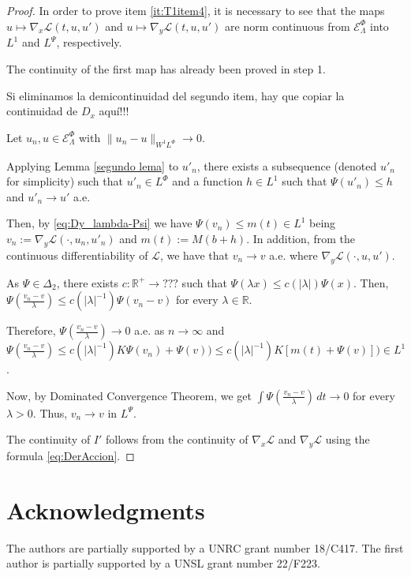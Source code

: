 \documentclass[twoside]{article}
\theoremstyle{remark}
\newcommand{\lphi}{L^{\Phi}}
\newcommand{\lpsi}{L^{\Psi}}
\newcommand{\sobnor}{\|_{W^{1}\lphi}}
\newcommand{\domi}{\mathcal{E}^{\Phi}}
\newcommand{\rr}{\mathbb{R}}
\renewcommand{\leq}{\leqslant}
\begin{document}
\begin{proof}
In order to prove item  \ref{it:T1item4}, it is necessary to see that the maps $u\mapsto \nabla_x\mathcal{L}(t,u,u')$  
and $u\mapsto \nabla_y\mathcal{L}(t,u,u')$  are norm continuous
from $\domi_{\Lambda} $ into $L^1$ and
 $\lpsi$, respectively.  

The continuity of the first map has already been proved in step 1. 

Si eliminamos la demicontinuidad del segundo item, hay que copiar 
la continuidad de $D_x$ aqu\'i!!!

Let $u_n, u \in \domi_{\Lambda}$ with $\|u_n- u\sobnor\to 0$.  

Applying Lemma \ref{segundo lema} to $u'_n$, 
there exists a subsequence (denoted $u'_n$ for simplicity)
such that
$u'_n \in L^\Phi$ and a function  $h \in L^1$  such that  $\Psi(u'_n)\leq h$ and $u'_n \to u'$ a.e.

Then, by \eqref{eq:Dy_lambda-Psi} we have
 $ \Psi(v_n) 
	\leq m(t) \in L^1$
 being  $v_n:=\nabla_y\mathcal{L}(\cdot,u_n,u'_n)$ and $m(t):= M (b+h)$. 
In addition, from the continuous differentiability of $\mathcal{L}$, we have that
$v_n \to v$ a.e. where $\nabla_y\mathcal{L}(\cdot,u,u')$.

As  $\Psi\in\Delta_2$, there exists $c:\rr^+\to ???$ such that 
$\Psi(\lambda x)\leq c(|\lambda|)\Psi(x)$. 
Then, $\Psi(\frac{v_n-v}{\lambda})\leq c(|\lambda|^{-1})\Psi(v_n-v)$ for every $\lambda \in \rr$.

Therefore, $\Psi(\frac{v_n-v}{\lambda})\to 0$ a.e. as $n \to \infty$ and 
$\Psi(\frac{v_n-v}{\lambda})\leq c(|\lambda|^{-1})K\Psi(v_n)+\Psi(v))
\leq c(|\lambda|^{-1}) K [m(t)+\Psi(v)])\in L^1$.

Now, by Dominated Convergence Theorem, we get
$
\int \Psi(\frac{v_n-v}{\lambda})\,dt \to 0
$
for every $\lambda>0$. Thus, $v_n \to v$ in $L^{\Psi}$.

The continuity of $I'$  follows  from the continuity 
of $\nabla_x\mathcal{L}$ and $\nabla_y\mathcal{L}$ using the formula \eqref{eq:DerAccion}.
\end{proof}







\section*{Acknowledgments}
The authors are partially supported by a UNRC grant number 18/C417. The first author is  partially supported by a  UNSL grant number 22/F223. 




% 
 
 

\end{document}
